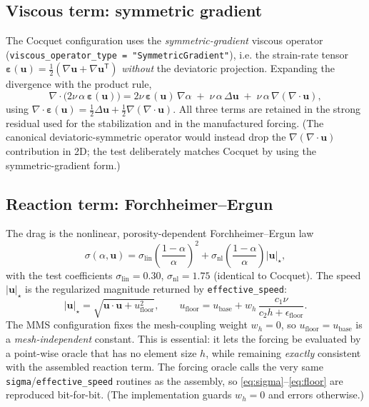 \documentclass[11pt]{article}
\newcommand{\uu}{\bm{u}}
\newcommand{\grad}{\nabla}
\newcommand{\dive}{\grad\!\cdot\!}
\newcommand{\eps}{\bm{\varepsilon}}
\begin{document}
\subsection{Viscous term: symmetric gradient}
\label{sec:visc}
The Cocquet configuration uses the \emph{symmetric-gradient} viscous operator
(\texttt{viscous\_operator\_type = "SymmetricGradient"}), i.e. the strain-rate
tensor $\eps(\uu)=\tfrac12(\grad\uu+\grad\uu^{\mathsf T})$ \emph{without} the
deviatoric projection. Expanding the divergence with the product rule,
\begin{equation}
\dive\!\big(2\nu\,\alpha\,\eps(\uu)\big)
   = 2\nu\,\eps(\uu)\,\grad\alpha
     \;+\;\nu\,\alpha\,\Delta\uu
     \;+\;\nu\,\alpha\,\grad(\dive\uu),
  \label{eq:visc-strong}
\end{equation}
using $\dive\eps(\uu)=\tfrac12\Delta\uu+\tfrac12\grad(\dive\uu)$. All three
terms are retained in the strong residual used for the stabilization and in the
manufactured forcing. (The canonical deviatoric-symmetric operator would
instead drop the $\grad(\dive\uu)$ contribution in 2D; the test deliberately
matches Cocquet by using the symmetric-gradient form.)

\subsection{Reaction term: Forchheimer--Ergun}
\label{sec:reac}
The drag is the nonlinear, porosity-dependent Forchheimer--Ergun law
\begin{equation}
\sigma(\alpha,\uu)
   = \sigma_{\mathrm{lin}}\left(\frac{1-\alpha}{\alpha}\right)^{\!2}
   + \sigma_{\mathrm{nl}}\left(\frac{1-\alpha}{\alpha}\right)\lvert\uu\rvert_\star ,
  \label{eq:sigma}
\end{equation}
with the test coefficients $\sigma_{\mathrm{lin}}=0.30$,
$\sigma_{\mathrm{nl}}=1.75$ (identical to Cocquet). The speed
$\lvert\uu\rvert_\star$ is the regularized magnitude returned by
\texttt{effective\_speed}:
\begin{equation}
\lvert\uu\rvert_\star=\sqrt{\uu\!\cdot\!\uu+u_{\mathrm{floor}}^2},
\qquad
u_{\mathrm{floor}} = u_{\mathrm{base}}
   + w_h\,\frac{c_1\nu}{c_2 h + \epsilon_{\mathrm{floor}}}.
  \label{eq:floor}
\end{equation}
The MMS configuration fixes the mesh-coupling weight $w_h=0$, so
$u_{\mathrm{floor}}=u_{\mathrm{base}}$ is a \emph{mesh-independent} constant.
This is essential: it lets the forcing be evaluated by a point-wise oracle that
has no element size $h$, while remaining \emph{exactly} consistent with the
assembled reaction term. The forcing oracle calls the very same
\texttt{sigma}/\texttt{effective\_speed} routines as the assembly, so
\eqref{eq:sigma}--\eqref{eq:floor} are reproduced bit-for-bit. (The
implementation guards $w_h=0$ and errors otherwise.)
\end{document}
